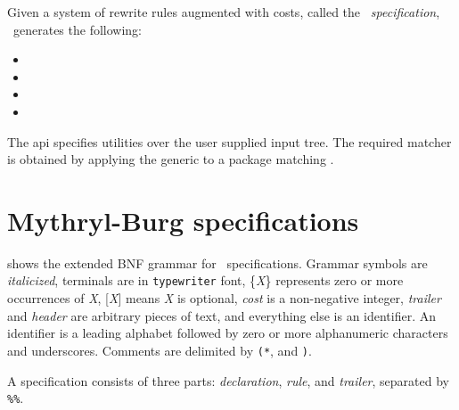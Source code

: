 Given a system of rewrite rules augmented with costs, called the {\em
\mlburg\ specification}, \mlburg\ generates the following:

\begin{itemize}
	\item{}
	\item{}
	\item{}
	\item{}
\end{itemize}

The api  specifies utilities over the 
user supplied input
tree. The required matcher is obtained by applying the generic
 to a package matching .



		\section{Mythryl-Burg specifications}

 shows the extended BNF grammar for 
\mlburg\ specifications. Grammar symbols are {\it italicized}, terminals
are in {\tt typewriter} font, \{{\it X}\} represents zero or more
occurrences of {\it X}, {\rm [}{\it X}{\rm ]} means {\it X} is optional, 
{\sl cost} is a non-negative integer, {\sl trailer} and {\sl header}
are arbitrary pieces of text, and everything else is an identifier.
An identifier is a leading alphabet followed by zero or more
alphanumeric characters and underscores. Comments are delimited
by {\tt (*}, and {\tt *)}. 

A specification consists of three parts: {\it declaration}, {\it rule},
and {\sl trailer}, separated by \verb|%%|.



